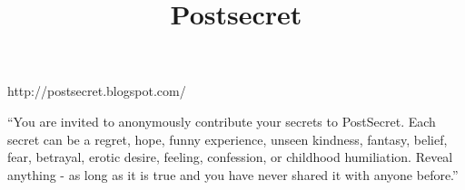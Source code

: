 \documentclass{beamer}
\title{Postsecret}
\date{}
\begin{document}
\frame{\titlepage}

\begin{frame}
  \begin{centering}
    http://postsecret.blogspot.com/
    \par
  \end{centering}
\end{frame}

\begin{frame}[plain]
  \begin{centering}
    \par
  \end{centering}
\end{frame}

\begin{frame}
  ``You are invited to anonymously contribute your secrets to PostSecret. Each secret can be a regret, hope, funny experience, unseen kindness, fantasy, belief, fear, betrayal, erotic desire, feeling, confession, or childhood humiliation. Reveal anything - as long as it is true and you have never shared it with anyone before.''
\end{frame}

\begin{frame}\end{frame}
\end{document}
